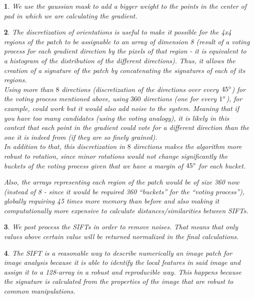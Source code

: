 \documentclass[10pt]{article} %
\theoremstyle{question-style}
\newtheorem{answer}{\arabic{answer}}
\begin{document}
\begin{flushleft}
\begin{answer}
We use the gaussian mask to add a bigger weight to the points in the center of pad in which we are calculating the gradient.
\end{answer}

\begin{answer}
The discretization of orientations is useful to make it possible for the 4x4 regions of the patch to be assignable to an array of dimension 8 (result of a voting process for each gradient direction by the pixels of that region - it is equivalent to a histogram of the distribution of the different directions). Thus, it allows the creation of a signature of the patch by concatenating the signatures of each of its regions. \\

\quad Using more than $8$ directions (discretization of the directions over every $45\degree$) for the voting process mentioned above, using $360$ directions (one for every $1\degree$), for example, could work but it would also add noise to the system. Meaning that if you have too many candidates (using the voting analogy), it is likely in this context that each point in the gradient could vote for a different direction than the one it is indeed from (if they are so finely grained). \\ 

\quad In addition to that, this discretization in $8$ directions makes the algorithm more robust to rotation, since minor rotations would not change significantly the buckets of the voting process given that we have a margin of $45\degree$ for each bucket.

\quad Also, the arrays representing each region of the patch would be of size 360 now (instead of 8 - since it would be required 360 “buckets” for the “voting process”), globally requiring 45 times more memory than before and also making it computationally more expensive to calculate distances/similarities between SIFTs.
\end{answer}

\begin{answer}
We post process the SIFTs in order to remove noises. That means that only values above certain value will be returned normalized in the final calculations.
\end{answer}

\begin{answer} %
The SIFT is a reasonable way to describe numerically an image patch for image analysis because it is able to identify the local features in said image and assign it to a 128-array in a robust and reproducible way. This happens because the signature is calculated from the properties of the image that are robust to common manipulations.


\end{answer}
\end{flushleft}
\end{document}
